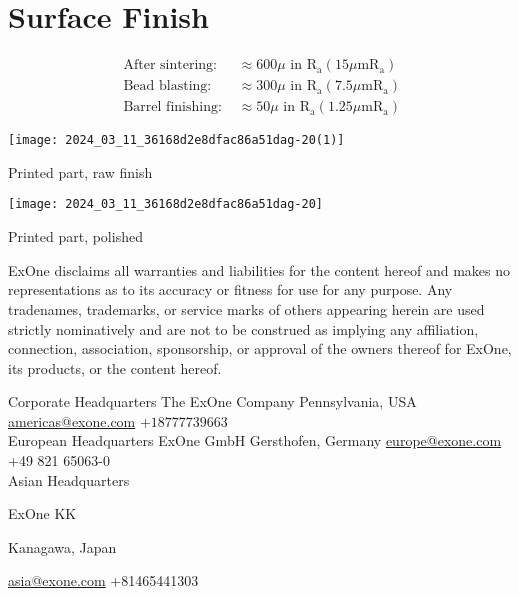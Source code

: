 \documentclass[10pt]{article}
\begin{document}
\section*{Surface Finish}
$$
\begin{array}{ll}
\text { After sintering: } & \approx 600 \mu \text { in } \mathrm{R}_{\mathrm{a}}\left(15 \mu \mathrm{m} \mathrm{R}_{\mathrm{a}}\right) \\
\text { Bead blasting: } & \approx 300 \mu \text { in } \mathrm{R}_{\mathrm{a}}\left(7.5 \mu \mathrm{m} \mathrm{R}_{\mathrm{a}}\right) \\
\text { Barrel finishing: } & \approx 50 \mu \text { in } \mathrm{R}_{\mathrm{a}}\left(1.25 \mu \mathrm{m} \mathrm{R}_{\mathrm{a}}\right)
\end{array}
$$

\begin{center}
\texttt{[image: 2024\_03\_11\_36168d2e8dfac86a51dag-20(1)]}
\end{center}

Printed part, raw finish

\begin{center}
\texttt{[image: 2024\_03\_11\_36168d2e8dfac86a51dag-20]}
\end{center}

Printed part, polished

ExOne disclaims all warranties and liabilities for the content hereof and makes no representations as to its accuracy or fitness for use for any purpose. Any tradenames, trademarks, or service marks of others appearing herein are used strictly nominatively and are not to be construed as implying any affiliation, connection, association, sponsorship, or approval of the owners thereof for ExOne, its products, or the content hereof.

Corporate Headquarters The ExOne Company Pennsylvania, USA \href{mailto:americas@exone.com}{americas@exone.com} $+18777739663$\\
European Headquarters ExOne GmbH Gersthofen, Germany \href{mailto:europe@exone.com}{europe@exone.com} +49 821 65063-0\\
Asian Headquarters

ExOne KK

Kanagawa, Japan

\href{mailto:asia@exone.com}{asia@exone.com} +81465441303
\end{document}
